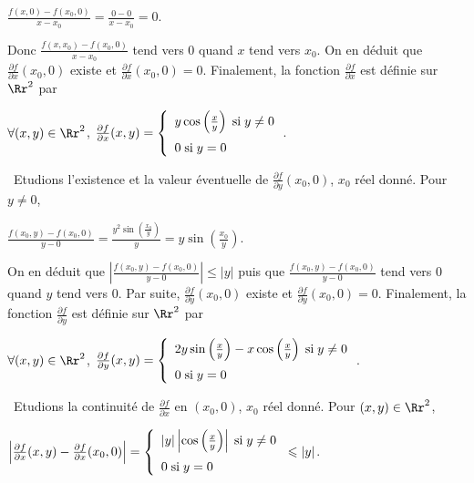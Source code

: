 {{\begin{center}
$ \frac{f(x,0)-f(x_0,0)}{x-x_0}= \frac{0-0}{x-x_0}=0$.
\end{center}

Donc $ \frac{f(x,x_0)-f(x_0,0)}{x-x_0}$ tend vers $0$ quand $x$ tend vers $x_0$. On en déduit que $ \frac{\partial f}{\partial x}(x_0,0)$ existe et $ \frac{\partial f}{\partial x}(x_0,0)=0$. Finalement, la fonction $ \frac{\partial f}{\partial x}$ est définie sur $\Rr^2$ par

\begin{center}
$\forall (x,y)\in\Rr^2$, $ \frac{\partial f}{\partial x}(x,y)=\left\{
\begin{array}{l}
y\cos\left( \frac{x}{y}\right)\;\text{si}\;y\neq0\\
\rule{0mm}{5mm}0\;\text{si}\;y=0
\end{array}
\right.$.
\end{center}

\textbullet~Etudions l'existence et la valeur éventuelle de $ \frac{\partial f}{\partial y}(x_0,0)$, $x_0$ réel donné. Pour $y\neq 0$,

\begin{center}
$ \frac{f(x_0,y)-f(x_0,0)}{y-0}= \frac{y^2\sin\left( \frac{x_0}{y}\right)}{y}=y\sin\left( \frac{x_0}{y}\right)$.
\end{center}

On en déduit que $\left| \frac{f(x_0,y)-f(x_0,0)}{y-0}\right|\leqslant|y|$ puis que $ \frac{f(x_0,y)-f(x_0,0)}{y-0}$ tend vers $0$ quand $y$ tend vers $0$. Par suite, $ \frac{\partial f}{\partial y}(x_0,0)$ existe et $ \frac{\partial f}{\partial y}(x_0,0)=0$. Finalement, la fonction $ \frac{\partial f}{\partial y}$ est définie sur $\Rr^2$ par

\begin{center}
$\forall (x,y)\in\Rr^2$, $ \frac{\partial f}{\partial y}(x,y)=\left\{
\begin{array}{l}
2y\sin\left( \frac{x}{y}\right)-x\cos\left( \frac{x}{y}\right)\;\text{si}\;y\neq0\\
\rule{0mm}{5mm}0\;\text{si}\;y=0
\end{array}
\right.$.
\end{center}

\textbullet~Etudions la continuité de $ \frac{\partial f}{\partial x}$ en $(x_0,0)$, $x_0$ réel donné. Pour $(x,y)\in\Rr^2$,

\begin{center}
$\left| \frac{\partial f}{\partial x}(x,y)- \frac{\partial f}{\partial x}(x_0,0)\right|=\left\{
\begin{array}{l}
|y|\left|\cos\left( \frac{x}{y}\right)\right|\;\text{si}\;y\neq0\\
\rule{0mm}{5mm}0\;\text{si}\;y=0
\end{array}
\right.\leqslant|y|$.
\end{center}

}}
